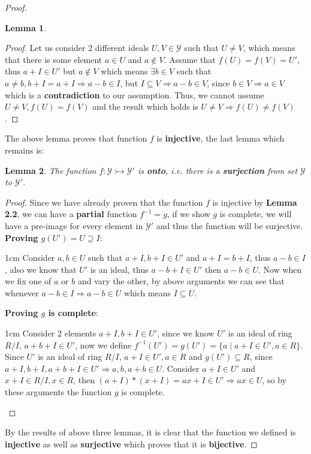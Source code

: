 \documentclass{article}
\let\bold\textbf
\newtheorem{lemma}{Lemma}[section]
\newenvironment{myenv}{\begin{adjustwidth}{1cm}{}}{\end{adjustwidth}}
\begin{document}
{\begin{proof}
\begin{lemma}
    \end{lemma}
    \begin{proof}
      Let us consider $2$ different ideals $U,V \in \mathcal{Y}$ such that $U \ne V$, which means that there is some element $a \in U$ and $a \notin V$. \newline
      Assume that $f(U)=f(V)=U'$, thus $a+I \in U'$ but $a \notin V$ which means $\exists b \in V$ such that $a\ne b,b+I=a+I\Rightarrow a-b \in I$, but $I \subseteq V \Rightarrow a-b \in V$, since $b \in V \Rightarrow a \in V$ which is a \bold{contradiction} to our assumption. \newline
      Thus, we cannot assume $U \ne V,f(U)=f(V)$ and the result which holds is $U \ne V \Rightarrow f(U) \ne f(V)$.
    \end{proof}
    The above lemma proves that function $f$ is \bold{injective}, the last lemma which remains is:
    \newpage
    \begin{lemma}
      The function $f:\mathcal{Y}\rightarrowtail\mathcal{Y}'$ is \bold{onto}, i.e. there is a \bold{surjection} from set $\mathcal{Y}$ to $\mathcal{Y}'$.
    \end{lemma}
    \begin{proof}
      Since we have already proven that the function $f$ is injective by \bold{Lemma 2.2}, we can have a \bold{partial} function $f^{-1}=g$, if we show $g$ is complete, we will have a pre-image for every element in $\mathcal{Y}'$ and thus the function will be surjective. \newline
      \bold{Proving $g(U')=U \supseteq I$}:
      \begin{myenv}
        Consider $a,b \in U$ such that $a+I,b+I \in U'$ and $a+I=b+I$, thus $a-b \in I$, also we know that $U'$ is an ideal, thus $a-b + I \in U'$ then $a-b \in U$. \newline
        Now when we fix one of $a$ or $b$ and vary the other, by above arguments we can see that whenever $a-b \in I \Rightarrow a-b \in U$ which means $I \subseteq U$.
      \end{myenv}
      \bold{Proving $g$ is complete}:
      \begin{myenv}
        Consider 2 elements $a+I,b+I \in U'$, since we know $U'$ is an ideal of ring $R/I$, $a+b+I \in U'$, now we define $f^{-1}(U')=g(U')=\{a \mid a+I \in U', a \in R\}$. \newline
        Since $U'$ is an ideal of ring $R/I$, $a+I \in U', a \in R$ and $g(U') \subseteq R$, since $a+I,b+I,a+b+I \in U' \Rightarrow a,b,a+b \in U$. \newline 
        Consider $a+I \in U'$ and $x+I \in R/I,x \in R$, then $(a+I)*(x+I)=ax+I \in U' \Rightarrow ax \in U$, so by these arguments the function $g$ is complete.
      \end{myenv}
    \end{proof}
    By the results of above three lemmas, it is clear that the function we defined is \bold{injective} as well as \bold{surjective} which proves that it is \bold{bijective}.
  \end{proof}
}
\newpage
\end{document}
